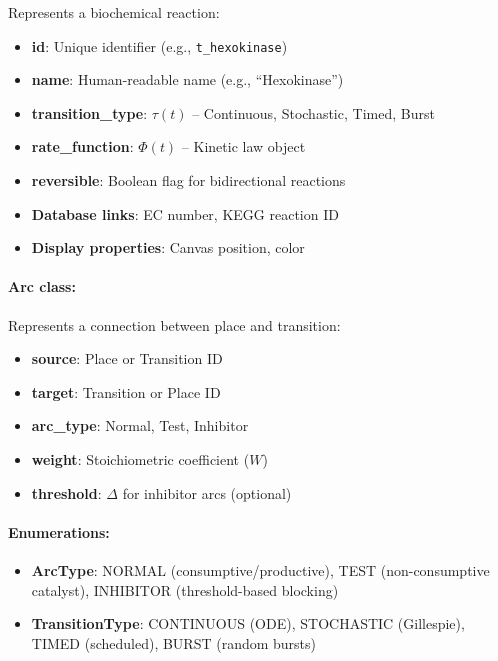 Represents a biochemical reaction:

\begin{itemize}
    \item \textbf{id}: Unique identifier (e.g., \texttt{t\_hexokinase})
    \item \textbf{name}: Human-readable name (e.g., ``Hexokinase'')
    \item \textbf{transition\_type}: $\tau(t)$ -- Continuous, Stochastic, Timed, Burst
    \item \textbf{rate\_function}: $\Phi(t)$ -- Kinetic law object
    \item \textbf{reversible}: Boolean flag for bidirectional reactions
    \item \textbf{Database links}: EC number, KEGG reaction ID
    \item \textbf{Display properties}: Canvas position, color
\end{itemize}

\paragraph{Arc class:}

Represents a connection between place and transition:

\begin{itemize}
    \item \textbf{source}: Place or Transition ID
    \item \textbf{target}: Transition or Place ID
    \item \textbf{arc\_type}: Normal, Test, Inhibitor
    \item \textbf{weight}: Stoichiometric coefficient ($W$)
    \item \textbf{threshold}: $\Delta$ for inhibitor arcs (optional)
\end{itemize}

\paragraph{Enumerations:}

\begin{itemize}
    \item \textbf{ArcType}: NORMAL (consumptive/productive), TEST (non-consumptive catalyst), INHIBITOR (threshold-based blocking)
    \item \textbf{TransitionType}: CONTINUOUS (ODE), STOCHASTIC (Gillespie), TIMED (scheduled), BURST (random bursts)
\end{itemize}

